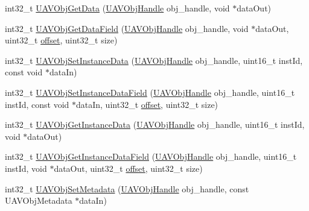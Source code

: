 \begin{DoxyCompactItemize}
\item 
int32\-\_\-t \hyperlink{group___u_a_v_object_handling_ga580decfc7a47e5f28215f1f940e3799e}{\-U\-A\-V\-Obj\-Get\-Data} (\hyperlink{targets_2_u_a_v_objects_2inc_2uavobjectmanager_8h_a279053e22be53ce9f895043aaeb91e3b}{\-U\-A\-V\-Obj\-Handle} obj\-\_\-handle, void $\ast$data\-Out)
\item 
int32\-\_\-t \hyperlink{group___u_a_v_object_handling_ga532ccb2e759fca49c89e425b872eed1c}{\-U\-A\-V\-Obj\-Get\-Data\-Field} (\hyperlink{targets_2_u_a_v_objects_2inc_2uavobjectmanager_8h_a279053e22be53ce9f895043aaeb91e3b}{\-U\-A\-V\-Obj\-Handle} obj\-\_\-handle, void $\ast$data\-Out, uint32\-\_\-t \hyperlink{group___sparky_b_l_gaa9fff43968831437a312428836cab362}{offset}, uint32\-\_\-t size)
\item 
int32\-\_\-t \hyperlink{group___u_a_v_object_handling_gaa9c916d3a8cabfc6d7a0f3d488d10803}{\-U\-A\-V\-Obj\-Set\-Instance\-Data} (\hyperlink{targets_2_u_a_v_objects_2inc_2uavobjectmanager_8h_a279053e22be53ce9f895043aaeb91e3b}{\-U\-A\-V\-Obj\-Handle} obj\-\_\-handle, uint16\-\_\-t inst\-Id, const void $\ast$data\-In)
\item 
int32\-\_\-t \hyperlink{group___u_a_v_object_handling_ga087c34a94f310e0b73ffa8d9e3dd02c6}{\-U\-A\-V\-Obj\-Set\-Instance\-Data\-Field} (\hyperlink{targets_2_u_a_v_objects_2inc_2uavobjectmanager_8h_a279053e22be53ce9f895043aaeb91e3b}{\-U\-A\-V\-Obj\-Handle} obj\-\_\-handle, uint16\-\_\-t inst\-Id, const void $\ast$data\-In, uint32\-\_\-t \hyperlink{group___sparky_b_l_gaa9fff43968831437a312428836cab362}{offset}, uint32\-\_\-t size)
\item 
int32\-\_\-t \hyperlink{group___u_a_v_object_handling_ga955799ae236e66aef4070f79d530d73c}{\-U\-A\-V\-Obj\-Get\-Instance\-Data} (\hyperlink{targets_2_u_a_v_objects_2inc_2uavobjectmanager_8h_a279053e22be53ce9f895043aaeb91e3b}{\-U\-A\-V\-Obj\-Handle} obj\-\_\-handle, uint16\-\_\-t inst\-Id, void $\ast$data\-Out)
\item 
int32\-\_\-t \hyperlink{group___u_a_v_object_handling_gadc17f6e4b8121257308645c34c5e48c8}{\-U\-A\-V\-Obj\-Get\-Instance\-Data\-Field} (\hyperlink{targets_2_u_a_v_objects_2inc_2uavobjectmanager_8h_a279053e22be53ce9f895043aaeb91e3b}{\-U\-A\-V\-Obj\-Handle} obj\-\_\-handle, uint16\-\_\-t inst\-Id, void $\ast$data\-Out, uint32\-\_\-t \hyperlink{group___sparky_b_l_gaa9fff43968831437a312428836cab362}{offset}, uint32\-\_\-t size)
\item 
int32\-\_\-t \hyperlink{group___u_a_v_object_handling_ga0e590d06148882b63affa37888f043df}{\-U\-A\-V\-Obj\-Set\-Metadata} (\hyperlink{targets_2_u_a_v_objects_2inc_2uavobjectmanager_8h_a279053e22be53ce9f895043aaeb91e3b}{\-U\-A\-V\-Obj\-Handle} obj\-\_\-handle, const \-U\-A\-V\-Obj\-Metadata $\ast$data\-In)

\end{DoxyCompactItemize}
